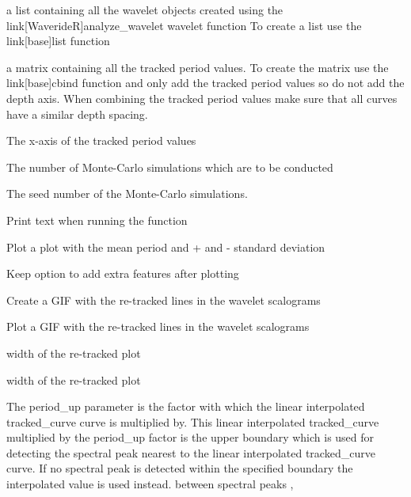 \documentclass[a4paper]{book}
\begin{document}
%
\begin{Arguments}
\begin{ldescription}
\item[\code{wt\_list}] a list containing all the wavelet objects created using the
link[WaverideR]analyze\_wavelet wavelet function
To create a list use the link[base]list function

\item[\code{data\_track}] a matrix containing all the tracked period values.
To create the matrix use the link[base]cbind function and only add the
tracked period values so do not add the depth axis. When combining the
tracked period values make sure that all curves have a similar depth
spacing.

\item[\code{x\_axis}] The x-axis of the tracked period values

\item[\code{nr\_simulations}] The number of Monte-Carlo simulations which are to be
conducted

\item[\code{seed\_nr}] The seed number of the Monte-Carlo simulations.

\item[\code{verbose}] Print text when running the function  

\item[\code{genplot}] Plot a plot with the mean period and + and - standard
deviation 

\item[\code{keep\_editable}] Keep option to add extra features after plotting

\item[\code{create\_GIF}] Create a GIF with the re-tracked lines in the wavelet
scalograms 

\item[\code{plot\_GIF}] Plot a GIF with the re-tracked lines in the wavelet
scalograms

\item[\code{width\_plt}] width of the re-tracked plot 

\item[\code{height\_plt}] width of the re-tracked plot 

\item[\code{period\_up}] The period\_up parameter is the factor with which the linear interpolated tracked\_curve
curve is multiplied by. This linear interpolated tracked\_curve multiplied by the period\_up factor is
the upper boundary which is used  for detecting the spectral peak nearest to the linear interpolated tracked\_curve
curve. If no spectral peak is detected within the specified boundary the interpolated
value is used instead. between spectral peaks ,


\end{ldescription}
\end{Arguments}
\end{document}
